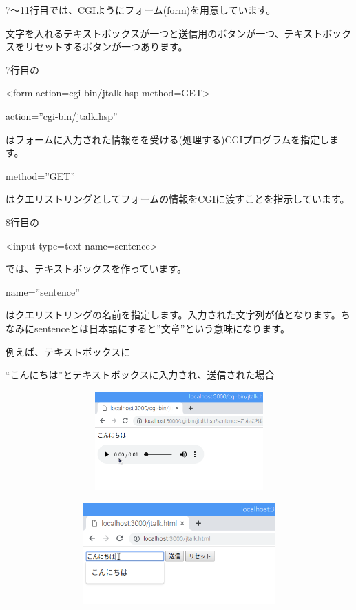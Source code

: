\documentclass[a4paper,12pt,dvipdfmx]{jarticle}
\begin{document}
\bigskip


\bigskip



\bigskip

7〜11行目では、CGIようにフォーム(form)を用意しています。

文字を入れるテキストボックスが一つと送信用のボタンが一つ、テキストボックスをリセットするボタンが一つあります。

%


7行目の

{\textless}form action={\textquotedbl}cgi-bin/jtalk.hsp{\textquotedbl}
method={\textquotedbl}GET{\textquotedbl}{\textgreater}

action=”cgi-bin/jtalk.hsp”

はフォームに入力された情報をを受ける(処理する)CGIプログラムを指定します。

method=”GET”

はクエリストリングとしてフォームの情報をCGIに渡すことを指示しています。

8行目の

{\textless}input type={\textquotedbl}text{\textquotedbl} name={\textquotedbl}sentence{\textquotedbl}{\textgreater}

では、テキストボックスを作っています。

name=”sentence”

はクエリストリングの名前を指定します。入力された文字列が値となります。ちなみにsentenceとは日本語にすると”文章”という意味になります。

例えば、テキストボックスに

“こんにちは”とテキストボックスに入力され、送信された場合

\clearpage
\bigskip



\centering
\includegraphics[width=14.392cm,height=3.796cm]{ome7-img057.png}

\centering
\includegraphics[width=14.319cm,height=3.902cm]{ome7-img056.png}
\flushleft
\end{document}
